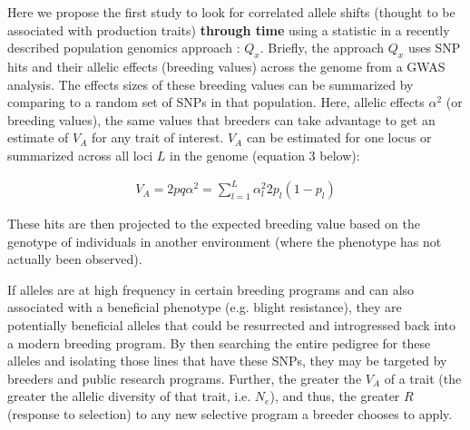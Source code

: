 \documentclass[12pt]{article}
\begin{document}
Here we propose the first study to look for correlated allele shifts (thought to be associated with production traits) \textbf{through time} using a statistic in a recently described population genomics approach \cite{Berg:2014bs}: $Q_{x}$. 
Briefly, the approach $Q_{x}$ uses SNP hits and their allelic effects (breeding values) across the genome from a GWAS analysis. The effects sizes of these breeding values can be summarized by comparing to a random set of SNPs in that population. Here, allelic effects $\alpha^{2}$ (or breeding values), the same values that  breeders can take advantage to get an estimate of $V_{A}$ for any trait of interest. $V_{A}$ can be estimated for one locus or summarized across all loci $L$ in the genome (equation 3 below):

\begin{align}
    V_A = 2pq\alpha^2 = \sum_{l=1}^L\alpha^2_l2p_l(1-p_l)
\end{align}

These hits are then projected to the expected breeding value based on the genotype of individuals in another environment (where the phenotype has not actually been observed). 

If alleles are at high frequency in certain breeding programs and can also associated with a beneficial phenotype (e.g. blight resistance), they are potentially beneficial alleles that could be resurrected and introgressed back into a modern breeding program. 
By then searching the entire pedigree for these alleles and isolating those lines that have these SNPs, they may be targeted by breeders and public research programs.
Further, the greater the $V_A$ of a trait (the greater the allelic diversity of that trait, i.e. $N_{e}$), and thus, the greater $R$ (response to selection) to any new selective program a breeder chooses to apply.

\end{document}
